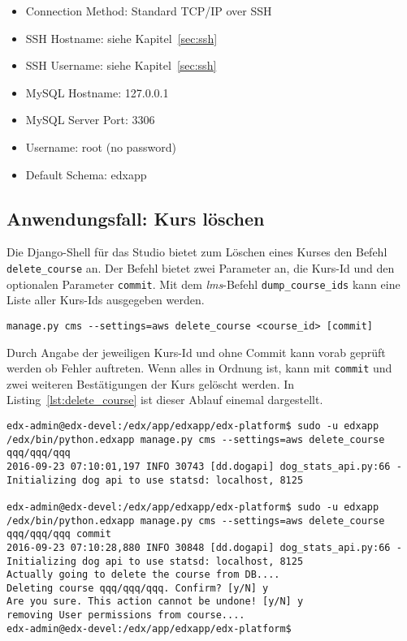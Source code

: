 \documentclass{scrartcl}
\begin{document}
\begin{itemize}
\item Connection Method: Standard TCP/IP over SSH
\item SSH Hostname: siehe Kapitel~\ref{sec:ssh}
\item SSH Username: siehe Kapitel~\ref{sec:ssh}
\item MySQL Hostname: 127.0.0.1
\item MySQL Server Port: 3306
\item Username: root (no password)
\item  Default Schema: edxapp
\end{itemize}

\subsection{Anwendungsfall: Kurs löschen}

Die Django-Shell für das Studio bietet zum Löschen eines Kurses den Befehl \lstinline|delete_course| an. Der Befehl bietet zwei Parameter an, die Kurs-Id und den optionalen Parameter \lstinline|commit|. Mit dem \textit{lms}-Befehl \lstinline|dump_course_ids| kann eine Liste aller Kurs-Ids ausgegeben werden.

\begin{lstlisting}[caption={Syntax \lstinline|delete_course|}, label=lst:delete_course_syntax, breaklines]
manage.py cms --settings=aws delete_course <course_id> [commit]
\end{lstlisting}

Durch Angabe der jeweiligen Kurs-Id und ohne Commit kann vorab geprüft werden ob Fehler auftreten. Wenn alles in Ordnung ist, kann mit \lstinline|commit| und zwei weiteren Bestätigungen der Kurs gelöscht werden. In Listing~\ref{lst:delete_course} ist dieser Ablauf einemal dargestellt.

\begin{lstlisting}[caption={Ausgabe nach \lstinline|delete_course| erst ohne und dann mit commit}, label=lst:delete_course, breaklines]
edx-admin@edx-devel:/edx/app/edxapp/edx-platform$ sudo -u edxapp /edx/bin/python.edxapp manage.py cms --settings=aws delete_course qqq/qqq/qqq
2016-09-23 07:10:01,197 INFO 30743 [dd.dogapi] dog_stats_api.py:66 - Initializing dog api to use statsd: localhost, 8125

edx-admin@edx-devel:/edx/app/edxapp/edx-platform$ sudo -u edxapp /edx/bin/python.edxapp manage.py cms --settings=aws delete_course qqq/qqq/qqq commit
2016-09-23 07:10:28,880 INFO 30848 [dd.dogapi] dog_stats_api.py:66 - Initializing dog api to use statsd: localhost, 8125
Actually going to delete the course from DB....
Deleting course qqq/qqq/qqq. Confirm? [y/N] y
Are you sure. This action cannot be undone! [y/N] y
removing User permissions from course....
edx-admin@edx-devel:/edx/app/edxapp/edx-platform$
\end{lstlisting}
\end{document}
